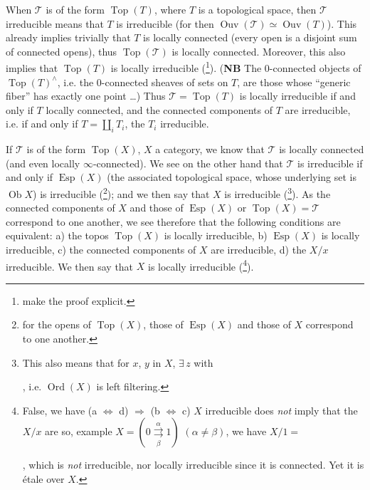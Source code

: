 \documentclass[11pt]{article}
\newcommand{\printedpage}[1]{\marginpar{\footnotesize p.~#1}}
\newcommand{\msp}[1]{\marginpar{\footnotesize [#1]}}
\begin{document}
When $\mathcal{T}$ is of the form $\operatorname{Top}(T)$, where $T$ is a topological space, then $\mathcal{T}$ irreducible means that $T$ is irreducible (for then $\operatorname{Ouv}(\mathcal{T}) \simeq \operatorname{Ouv}(T)$). This already implies trivially that $T$ is locally connected (every open is a disjoint sum of connected opens), thus $\operatorname{Top}(\mathcal{T})$ is locally connected. Moreover, this also implies that $\operatorname{Top}(T)$ is locally irreducible (\footnote[7]{make the proof explicit.}). (\textbf{NB} The 0-connected objects %
\msp{page 12}
of $\operatorname{Top}(T)^\wedge$, i.e. the 0-connected sheaves of sets on $T$, are those whose ``generic fiber'' has exactly one point \dots) Thus $\mathcal{T} = \operatorname{Top}(T)$ is locally irreducible if and only if $T$ locally connected, and the connected components of $T$ are irreducible, i.e. if and only if $T = \coprod_i T_i$, the $T_i$ irreducible.

If $\mathcal{T}$ is of the form $\operatorname{Top}(X)$, $X$ a category, we know that $\mathcal{T}$ is locally connected (and even locally $\infty$-connected). We see on the other hand that $\mathcal{T}$ is irreducible if and only if $\operatorname{Esp}(X)$ (the associated topological space, whose underlying set is $\operatorname{Ob} X$) is irreducible (\footnote[8]{for the opens of $\operatorname{Top}(X)$, those of $\operatorname{Esp}(X)$ and those of $X$ correspond to one another.}); and we then say that $X$ is irreducible (\footnote[9]{This also means that for $x$, $y$ in $X$, $\exists\, z$ with , i.e. $\operatorname{Ord}(X)$ is left filtering.}). As the connected components of $X$ and those of $\operatorname{Esp}(X)$ or $\operatorname{Top}(X) = \mathcal{T}$ correspond to one another, we see therefore that the following conditions are equivalent: a) the topos $\operatorname{Top}(X)$ is locally irreducible, b)
\printedpage{8}
$\operatorname{Esp}(X)$ is locally irreducible, c) the connected components of $X$ are irreducible, d) the $X/x$ irreducible. We then say that $X$ is locally irreducible (\footnote[10]{False, we have (a $\Longleftrightarrow$ d) $\Longrightarrow$ (b $\Longleftrightarrow$ c) $X$ irreducible does \textit{not} imply that the $X/x$ are so, example $X = (0 \overset{\alpha}{\underset{\beta}{\rightrightarrows}} 1)$ $(\alpha \neq \beta)$, we have $X/1 =$ , which is \textit{not} irreducible, nor locally irreducible since it is connected. Yet it is étale over $X$.}).
\end{document}
